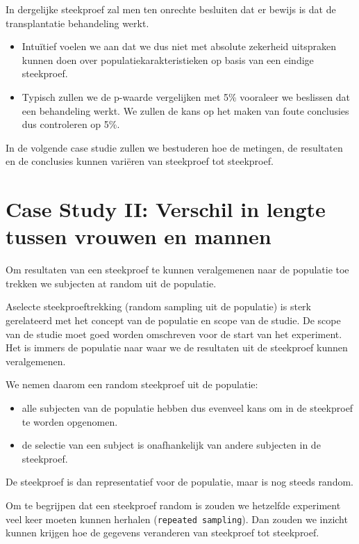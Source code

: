 \documentclass[
  12pt,dutch]{book}
\theoremstyle{definition}
\theoremstyle{definition}
\theoremstyle{definition}
\theoremstyle{definition}
\theoremstyle{remark}
\begin{document}
In dergelijke steekproef zal men ten onrechte besluiten dat er bewijs is dat de transplantatie behandeling werkt.

\begin{itemize}
\item
  Intuïtief voelen we aan dat we dus niet met absolute zekerheid uitspraken kunnen doen over populatiekarakteristieken op basis van een eindige steekproef.
\item
  Typisch zullen we de p-waarde vergelijken met 5\% vooraleer we beslissen dat een behandeling werkt. We zullen de kans op het maken van foute conclusies dus controleren op 5\%.
\end{itemize}

In de volgende case studie zullen we bestuderen hoe de metingen, de resultaten en de conclusies kunnen variëren van steekproef tot steekproef.

\section{Case Study II: Verschil in lengte tussen vrouwen en mannen}\label{case-study-ii-verschil-in-lengte-tussen-vrouwen-en-mannen}

Om resultaten van een steekproef te kunnen veralgemenen naar de populatie toe trekken we subjecten at random uit de populatie.

Aselecte steekproeftrekking (random sampling uit de populatie) is sterk gerelateerd met het concept van de populatie en scope van de studie.
De scope van de studie moet goed worden omschreven voor de start van het experiment. Het is immers de populatie naar waar we de resultaten uit de steekproef kunnen veralgemenen.

We nemen daarom een random steekproef uit de populatie:

\begin{itemize}
\item
  alle subjecten van de populatie hebben dus evenveel kans om in de steekproef te worden opgenomen.
\item
  de selectie van een subject is onafhankelijk van andere subjecten in de steekproef.
\end{itemize}

De steekproef is dan representatief voor de populatie, maar is nog steeds random.

Om te begrijpen dat een steekproef random is zouden we hetzelfde experiment veel keer moeten kunnen herhalen (\texttt{repeated\ sampling}). Dan zouden we inzicht kunnen krijgen hoe de gegevens veranderen van steekproef tot steekproef.
\end{document}
